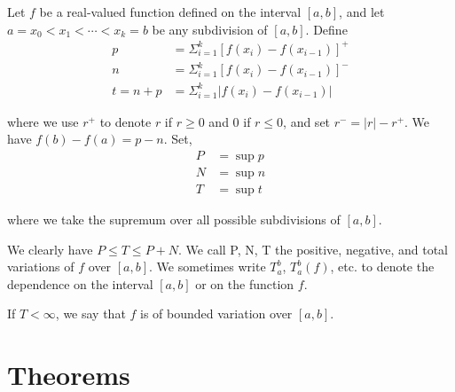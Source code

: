 \documentclass[12pt]{article}
\begin{document}
\begin{itemize}
Let $f$ be a real-valued function defined on the interval $[a, b]$, and let $a = x_0 < x_1 < \cdots < x_k = b$ be any subdivision of $[a, b]$. Define 
\begin{align*}
p &= \Sigma_{i=1}^k [f(x_i) - f(x_{i-1})]^+\\
n &= \Sigma_{i=1}^k [f(x_i) - f(x_{i-1})]^-\\
t = n + p &= \Sigma_{i=1}^k |f(x_i) - f(x_{i-1})|
\end{align*}

where we use $r^+$ to denote $r$ if $r \geq 0$ and $0$ if $r \leq 0$, and set $r^- = |r| - r^+$. We have $f(b) - f(a) = p - n$. Set,
\begin{align*}
P &= \sup p\\
N &= \sup n\\
T &= \sup t
\end{align*}

where we take the supremum over all possible subdivisions of $[a, b]$.

We clearly have $P \leq T \leq P+N$. We call P, N, T the positive, negative, and total variations of $f$ over $[a, b]$. We sometimes write $T_a^b$, $T_a^b(f)$, etc. to denote the dependence on the interval $[a, b]$ or on the function $f$.

If $T < \infty$, we say that $f$ is of bounded variation over $[a, b]$.
\end{itemize}

\newpage
\section{Theorems}
\end{document}
